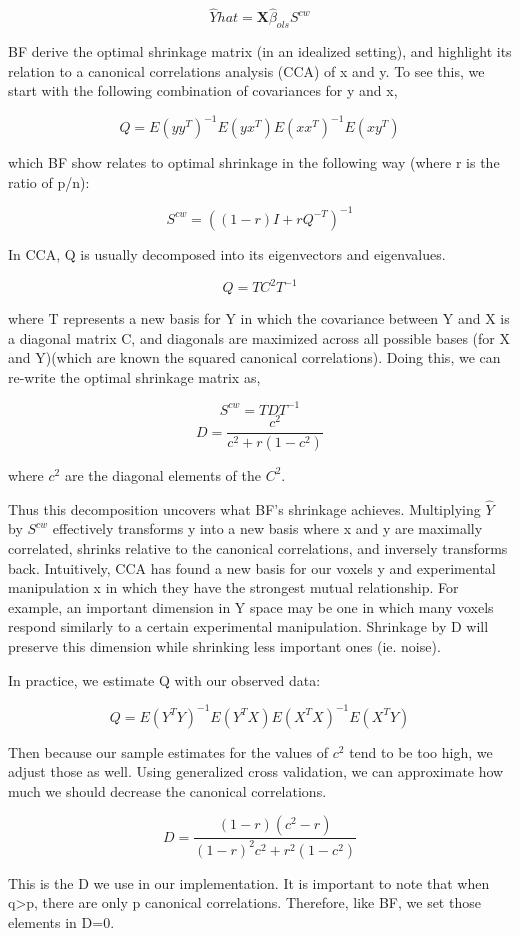 \documentclass{article}
\begin{document}
\[  \hat Yhat = \textbf{X} \hat \beta_{ols} S^{cw} \]

BF derive the optimal shrinkage matrix (in an idealized setting), and
highlight its relation to a canonical correlations analysis (CCA) of x
and y. To see this, we start with the following combination of
covariances for y and x,

\[ Q = E(yy^T)^{-1}E(yx^T)E(xx^T)^{-1}E(xy^T) \]

which BF show relates to optimal shrinkage in the following way (where r
is the ratio of p/n):

\[ S^{cw} = ((1-r)I+rQ^{-T})^{-1} \]

In CCA, Q is usually decomposed into its eigenvectors and eigenvalues.

\[ Q = T C^2 T^{-1} \]

where T represents a new basis for Y in which the covariance between Y
and X is a diagonal matrix C, and diagonals are maximized across all
possible bases (for X and Y)(which are known the squared canonical
correlations). Doing this, we can re-write the optimal shrinkage matrix
as,

\[ S^{cw} = T D T^{-1} \] \[ D = \frac{c^2}{c^2 + r(1-c^2)} \]

where $ c^{2} $ are the diagonal elements of the \(C^2\).


Thus this decomposition uncovers what BF's shrinkage achieves.
Multiplying \(\hat Y\) by $ S^{cw} $ effectively
transforms y into a new basis where x and y are maximally correlated,
shrinks relative to the canonical correlations, and inversely transforms
back. Intuitively, CCA has found a new basis for our voxels y and
experimental manipulation x in which they have the strongest mutual
relationship. For example, an important dimension in Y space may be one
in which many voxels respond similarly to a certain experimental
manipulation. Shrinkage by D will preserve this dimension while
shrinking less important ones (ie. noise).

In practice, we estimate Q with our observed data:

\[ Q = E(Y^T Y)^{-1}E(Y^T X)E(X^T X)^{-1}E(X^T Y) \]

Then because our sample estimates for the values of $ c^{2} $ tend to
be too high, we adjust those as well. Using generalized cross
validation, we can approximate how much we should decrease the canonical
correlations.

\[ D = \frac{(1-r)(c^2-r)}{(1-r)^2c^2 + r^2(1-c^2)} \]

This is the D we use in our implementation. It is important to note that
when q\textgreater{}p, there are only p canonical correlations.
Therefore, like BF, we set those elements in D=0.
\end{document}
